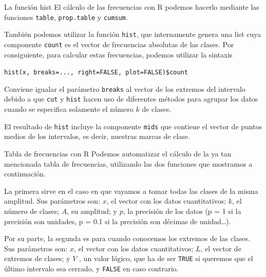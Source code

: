 \documentclass[
  ignorenonframetext,
  aspectratio=169]{beamer}
\begin{document}
\begin{frame}[fragile]{La función hist}
\protect\hypertarget{la-funciuxf3n-hist-1}{}
El cálculo de las frecuencias con R podemos hacerlo mediante las
funciones \texttt{table}, \texttt{prop.table} y \texttt{cumsum}.

También podemos utilizar la función \texttt{hist}, que internamente
genera una list cuya componente \texttt{count} es el vector de
frecuencias absolutas de las clases. Por consiguiente, para calcular
estas frecuencias, podemos utilizar la sintaxis

\texttt{hist(x,\ breaks=...,\ right=FALSE,\ plot=FALSE)\$count}

Conviene igualar el parámetro \texttt{breaks} al vector de los extremos
del intervalo debido a que \texttt{cut} y \texttt{hist} hacen uso de
diferentes métodos para agrupar los datos cuando se especifica solamente
el número \(k\) de clases.

El resultado de \texttt{hist} incluye la componente \texttt{mids} que
contiene el vector de puntos medios de los intervalos, es decir,
nuestras marcas de clase.
\end{frame}

\begin{frame}[fragile]{Tabla de frecuencias con R}
\protect\hypertarget{tabla-de-frecuencias-con-r}{}
Podemos automatizar el cálculo de la ya tan mencionada tabla de
frecuencias, utilizando las dos funciones que mostramos a continuación.

La primera sirve en el caso en que vayamos a tomar todas las clases de
la misma amplitud. Sus parámetros son: \(x\), el vector con los datos
cuantitativos; \(k\), el número de clases; \(A\), su amplitud; y \(p\),
la precisión de los datos (p = 1 si la precisión son unidades, p = 0.1
si la precisión son décimas de unidad\ldots).

Por su parte, la segunda es para cuando conocemos los extremos de las
clases. Sus parámetros son: \(x\), el vector con los datos
cuantitativos; \(L\), el vector de extremos de clases; y \(V\) , un
valor lógico, que ha de ser \texttt{TRUE} si queremos que el último
intervalo sea cerrado, y \texttt{FALSE} en caso contrario.
\end{frame}
\end{document}
